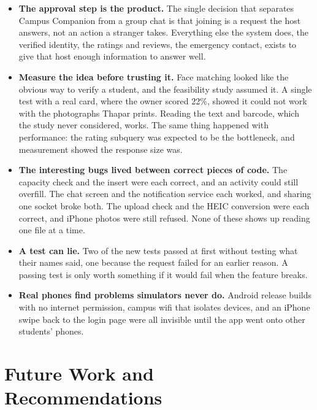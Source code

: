 \documentclass{tietreport}
\begin{document}
\begin{itemize}
  \item \textbf{The approval step is the product.} The single decision that separates
        Campus Companion from a group chat is that joining is a request the host answers,
        not an action a stranger takes. Everything else the system does, the verified
        identity, the ratings and reviews, the emergency contact, exists to give that host
        enough information to answer well.

  \item \textbf{Measure the idea before trusting it.} Face matching looked like the obvious
        way to verify a student, and the feasibility study assumed it. A single test with a
        real card, where the owner scored 22\%, showed it could not work with the photographs
        Thapar prints. Reading the text and barcode, which the study never considered, works.
        The same thing happened with performance: the rating subquery was expected to be the
        bottleneck, and measurement showed the response size was.

  \item \textbf{The interesting bugs lived between correct pieces of code.} The capacity check
        and the insert were each correct, and an activity could still overfill. The chat screen
        and the notification service each worked, and sharing one socket broke both. The
        upload check and the HEIC conversion were each correct, and iPhone photos were still
        refused. None of these shows up reading one file at a time.

  \item \textbf{A test can lie.} Two of the new tests passed at first without testing what
        their names said, one because the request failed for an earlier reason. A passing test
        is only worth something if it would fail when the feature breaks.

  \item \textbf{Real phones find problems simulators never do.} Android release builds with
        no internet permission, campus wifi that isolates devices, and an iPhone swipe back to
        the login page were all invisible until the app went onto other students' phones.
\end{itemize}

\section{Future Work and Recommendations}
\end{document}
